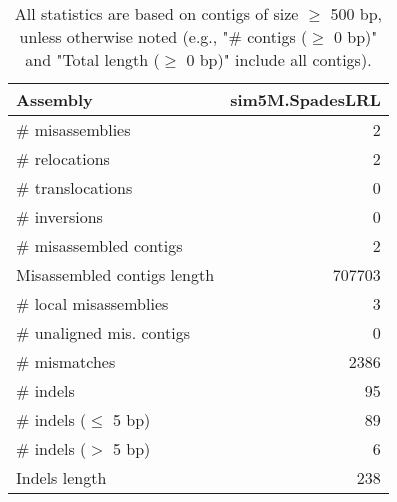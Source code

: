\documentclass[12pt,a4paper]{article}
\begin{document}
\begin{table}[ht]
\begin{center}
\caption{All statistics are based on contigs of size $\geq$ 500 bp, unless otherwise noted (e.g., "\# contigs ($\geq$ 0 bp)" and "Total length ($\geq$ 0 bp)" include all contigs).}
\begin{tabular}{|l*{1}{|r}|}
\hline
Assembly & sim5M.SpadesLRL \\ \hline
\# misassemblies & 2 \\ \hline
\hspace{5mm}\# relocations & 2 \\ \hline
\hspace{5mm}\# translocations & 0 \\ \hline
\hspace{5mm}\# inversions & 0 \\ \hline
\# misassembled contigs & 2 \\ \hline
Misassembled contigs length & 707703 \\ \hline
\# local misassemblies & 3 \\ \hline
\# unaligned mis. contigs & 0 \\ \hline
\# mismatches & 2386 \\ \hline
\# indels & 95 \\ \hline
\hspace{5mm}\# indels ($\leq$ 5 bp) & 89 \\ \hline
\hspace{5mm}\# indels ($>$ 5 bp) & 6 \\ \hline
Indels length & 238 \\ \hline
\end{tabular}
\end{center}
\end{table}
\end{document}
